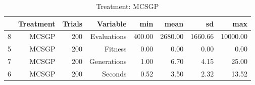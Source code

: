 \begin{table}[ht]
\centering
\begin{tabular}{rrrrrrrr}
  \hline
 & Treatment & Trials & Variable & min & mean & sd & max \\ 
  \hline
8 & MCSGP & 200 & Evaluations & 400.00 & 2680.00 & 1660.66 & 10000.00 \\ 
  5 & MCSGP & 200 & Fitness & 0.00 & 0.00 & 0.00 & 0.00 \\ 
  7 & MCSGP & 200 & Generations & 1.00 & 6.70 & 4.15 & 25.00 \\ 
  6 & MCSGP & 200 & Seconds & 0.52 & 3.50 & 2.32 & 13.52 \\ 
   \hline
\end{tabular}
\caption{Treatment: MCSGP} 
\end{table}
